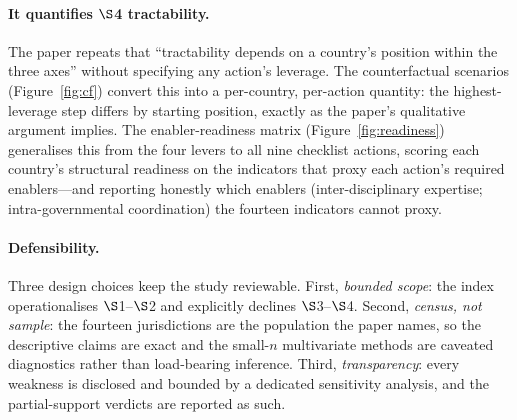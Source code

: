 \documentclass[11pt]{article}
\begin{document}
\paragraph{It quantifies $\S$4 tractability.} The paper repeats that ``tractability depends on a country's position within the three axes'' without specifying any action's leverage. The counterfactual scenarios (Figure~\ref{fig:cf}) convert this into a per-country, per-action quantity: the highest-leverage step differs by starting position, exactly as the paper's qualitative argument implies. The enabler-readiness matrix (Figure~\ref{fig:readiness}) generalises this from the four levers to all nine checklist actions, scoring each country's structural readiness on the indicators that proxy each action's required enablers---and reporting honestly which enablers (inter-disciplinary expertise; intra-governmental coordination) the fourteen indicators cannot proxy.

\paragraph{Defensibility.} Three design choices keep the study reviewable. First, \emph{bounded scope}: the index operationalises $\S$1--$\S$2 and explicitly declines $\S$3--$\S$4. Second, \emph{census, not sample}: the fourteen jurisdictions are the population the paper names, so the descriptive claims are exact and the small-$n$ multivariate methods are caveated diagnostics rather than load-bearing inference. Third, \emph{transparency}: every weakness is disclosed and bounded by a dedicated sensitivity analysis, and the partial-support verdicts are reported as such.
\end{document}
